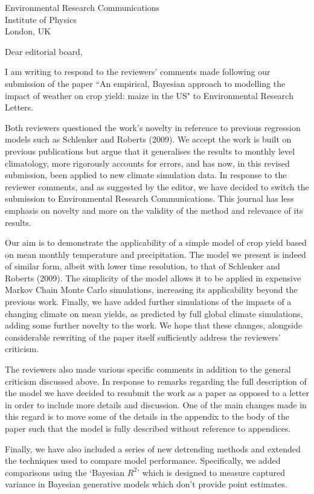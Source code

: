 \documentclass{letter}
\begin{document}
\begin{letter}{Environmental Research Communications \\ Institute of Physics \\ London, UK}

\opening{Dear editorial board,}

I am writing to respond to the reviewers' comments made following our submission of the paper ``An empirical, Bayesian approach to modelling the impact of weather on crop yield: maize in the US" to Environmental Research Letters. 

Both reviewers questioned the work's novelty in reference to previous regression models such as Schlenker and Roberts (2009). We accept the work is built on previous publications but argue that it generalises the results to monthly level climatology, more rigorously accounts for errors, and has now, in this revised submission, been applied to new climate simulation data. In response to the reviewer comments, and as suggested by the editor, we have decided to switch the submission to Environmental Research Communications. This journal has less emphasis on novelty and more on the validity of the method and relevance of its results. 

Our aim is to demonstrate the applicability of a simple model of crop yield based on mean monthly temperature and precipitation. The model we present is indeed of similar form, albeit with lower time resolution, to that of Schlenker and Roberts (2009). The simplicity of the model allows it to be applied in expensive Markov Chain Monte Carlo simulations, increasing its applicability beyond the previous work. Finally, we have added further simulations of the impacts of a changing climate on mean yields, as predicted by full global climate simulations, adding some further novelty to the work. We hope that these changes, alongside considerable rewriting of the paper itself sufficiently address the reviewers' criticism.

The reviewers also made various specific comments in addition to the general criticism discussed above. In response to remarks regarding the full description of the model we have decided to resubmit the work as a paper as opposed to a letter in order to include more details and discussion. One of the main changes made in this regard is to move some of the details in the appendix to the body of the paper such that the model is fully described without reference to appendices.

Finally, we have also included a series of new detrending methods and extended the techniques used to compare model performance. Specifically, we added comparisons using the `Bayesian $R^2$' which is designed to measure captured variance in Bayesian generative models which don't provide point estimates. 



\end{letter}
\end{document}
